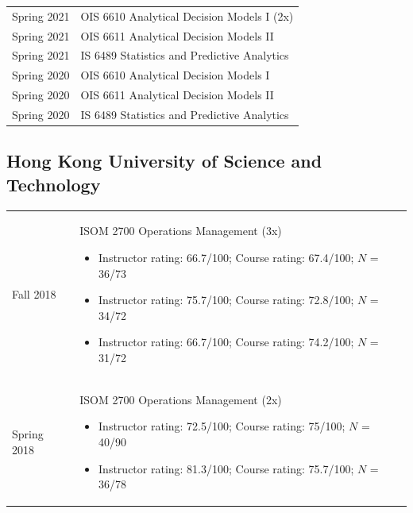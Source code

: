 \documentclass[11pt]{article}
\begin{document}
\begin{longtable}{p{2.5cm}p{14cm}}
		Spring 2021  & OIS 6610 Analytical Decision Models I  (2x) \\
		Spring 2021 & OIS 6611  Analytical Decision Models II \\
		Spring 2021 & IS 6489 Statistics and Predictive Analytics \\
		Spring 2020  & OIS 6610 Analytical Decision Models I   \\
		Spring 2020 &  OIS 6611  Analytical Decision Models II  \\
		Spring 2020 & IS 6489 Statistics and Predictive Analytics
\end{longtable}
\subsection*{Hong Kong University of Science and Technology}
			\begin{longtable}{p{2.5cm}p{14cm}}
		Fall 2018 & ISOM 2700 Operations Management (3x)
			\begin{itemize}[label={$\circ\;$}]
				\item Instructor rating: 66.7/100; Course rating: 67.4/100; $N$ = 36/73
			\item Instructor rating: 75.7/100; Course rating: 72.8/100; $N$ = 34/72
			\item Instructor rating: 66.7/100; Course rating: 74.2/100; $N$ = 31/72
		\end{itemize}\\
		Spring 2018 & ISOM 2700  Operations Management (2x)
			\begin{itemize}[label={$\circ\;$}]
				\item Instructor rating: 72.5/100; Course rating: 75/100; $N$ = 40/90
				\item Instructor rating: 81.3/100; Course rating: 75.7/100; $N$ = 36/78
			\end{itemize}
		\end{longtable}
\end{document}
